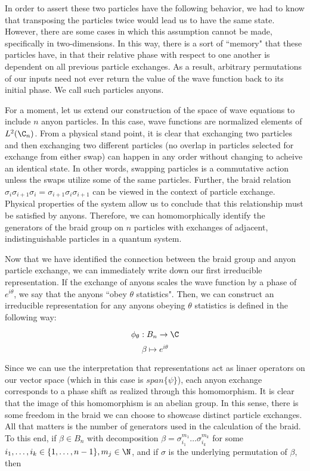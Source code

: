 In order to assert these two particles have the following behavior, we had to know that transposing the particles twice would lead us to have the same state. However, there are some cases in which this assumption cannot be made, specifically in two-dimensions. In this way, there is a sort of ``memory" that these particles have, in that their relative phase with respect to one another is dependent on all previous particle exchanges. As a result, arbitrary permutations of our inputs need not ever return the value of the wave function back to its initial phase. We call such particles anyons.

For a moment, let us extend our construction of the space of wave equations to include $n$ anyon particles. In this case, wave functions are normalized elements of $L^2(\C_n)$. From a physical stand point, it is clear that exchanging two particles and then exchanging two different particles (no overlap in particles selected for exchange from either swap) can happen in any order without changing to acheive an identical state. In other words, swapping particles is a commutative action unless the swaps utilize some of the same particles. Further, the braid relation $\sigma_i\sigma_{i+1}\sigma_i =\sigma_{i+1}\sigma_i\sigma_{i+1}$ can be viewed in the context of particle exchange. Physical properties of the system allow us to conclude that this relationship must be satisfied by anyons. Therefore, we can homomorphically identify the generators of the braid group on $n$ particles with exchanges of adjacent, indistinguishable particles in a quantum system.

Now that we have identified the connection between the braid group and anyon particle exchange, we can immediately write down our first irreducible representation. If the exchange of anyons scales the wave function by a phase of $e^{i\theta}$, we say that the anyons ``obey $\theta$ statistics". Then, we can construct an irreducible representation for any anyons obeying $\theta$ statistics is defined in the following way:

$$\phi_\theta:B_n\rightarrow \C$$
$$\beta\mapsto e^{i\theta}$$

Since we can use the interpretation that representations act as linaer operators on our vector space (which in this case is $span\{\psi\}$), each anyon exchange corresponds to a phase shift as realized through this homomorphism. It is clear that the image of this homomorphism is an abelian group. In this sense, there is some freedom in the braid we can choose to showcase distinct particle exchanges. All that matters is the number of generators used in the calculation of the braid. To this end, if $\beta\in B_n$ with decomposition $\beta = \sigma^{m_1}_{i_1}\hdots\sigma^{m_k}_{i_k}$ for some $i_1,\hdots,i_k\in\{1,\hdots,n-1\},m_j\in\N$, and if $\sigma$ is the underlying permutation of $\beta$, then


